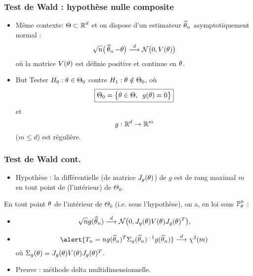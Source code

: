 \begin{frame}
\frametitle{Test de Wald : hypothèse nulle composite}
\begin{itemize}
\item \alert{ Même contexte:} $\Theta \subset \operatorname{{\mathbb R}}^d$ et \alert{on dispose} d'un estimateur $\operatorname{\widehat \theta_{\mathnormal{n}}}$ asymptotiquement normal :
$$\sqrt{n}\big(\operatorname{\widehat \theta_{\mathnormal{n}}}-\theta\big)\stackrel{d}{\longrightarrow} {\mathcal N}\big(0, V(\theta)\big)$$
où la matrice $V(\theta)$ est \alert{définie positive} et continue en $\theta$.
\item \alert{But} Tester $H_0: \theta \in \Theta_0$ contre $H_1:\theta \notin \Theta_0$, où
$$\boxed{\Theta_0 = \big\{\theta \in \Theta,\;\;g(\theta) = 0\big\}}$$
et
$$g:\operatorname{{\mathbb R}}^d \rightarrow \operatorname{{\mathbb R}}^m$$
($m \leq d$) est régulière.
\end{itemize}
\end{frame}




\begin{frame}
\frametitle{Test de Wald cont.}
\begin{itemize}
\item \alert{Hypothèse : } la différentielle (de matrice $J_g(\theta)$) de $g$ est de rang maximal $m$ en tout point de (l'intérieur) de $\Theta_0$.
\end{itemize}
\begin{prop}
En tout point $\theta$ de l'intérieur de $\Theta_0$ (i.e. \alert{sous l'hypothèse}), on a, en loi sous $\operatorname{{\mathbb P}}_\theta^n$ :
\begin{itemize}
\item $$\sqrt{n}g(\operatorname{\widehat \theta_{\mathnormal{n}}}) \stackrel{d}{\longrightarrow} {\mathcal N}\big(0, J_g(\theta)V(\theta)J_g(\theta)^T\big),$$
\item $$\alert{T_n=ng(\est)^T\Sigma_g(\est)^{-1}g(\est)} \stackrel{d}{\longrightarrow} \chi^2(m)$$
où $\Sigma_g(\theta) =J_g(\theta) V(\theta) J_g(\theta)^T$.
\end{itemize}
\end{prop}
\begin{itemize}
\item Preuve : méthode  delta  multidimensionnelle.
\end{itemize}
\end{frame}


